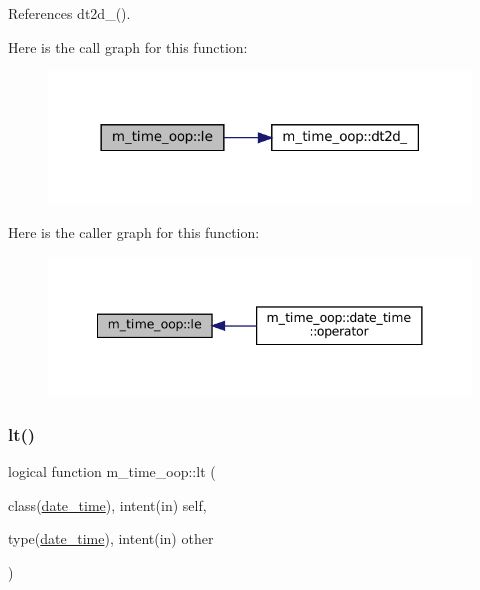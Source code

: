 References dt2d\+\_\+().

Here is the call graph for this function\+:\nopagebreak
\begin{figure}[H]
\begin{center}
\leavevmode
\includegraphics[width=318pt]{namespacem__time__oop_a5e04ff772ac6d72f68031ec43c1e6c84_cgraph}
\end{center}
\end{figure}
Here is the caller graph for this function\+:\nopagebreak
\begin{figure}[H]
\begin{center}
\leavevmode
\includegraphics[width=341pt]{namespacem__time__oop_a5e04ff772ac6d72f68031ec43c1e6c84_icgraph}
\end{center}
\end{figure}
\mbox{\label{namespacem__time__oop_ab0c5ce86d25993804501d59a8106818f}} 
\subsubsection{\texorpdfstring{lt()}{lt()}}
{\footnotesize\ttfamily logical function m\+\_\+time\+\_\+oop\+::lt (\begin{DoxyParamCaption}\item[{class(\mbox{\hyperlink{structm__time__oop_1_1date__time}{date\+\_\+time}}), intent(in)}]{self,  }\item[{type(\mbox{\hyperlink{structm__time__oop_1_1date__time}{date\+\_\+time}}), intent(in)}]{other }\end{DoxyParamCaption})\hspace{0.3cm}{\ttfamily [private]}}



